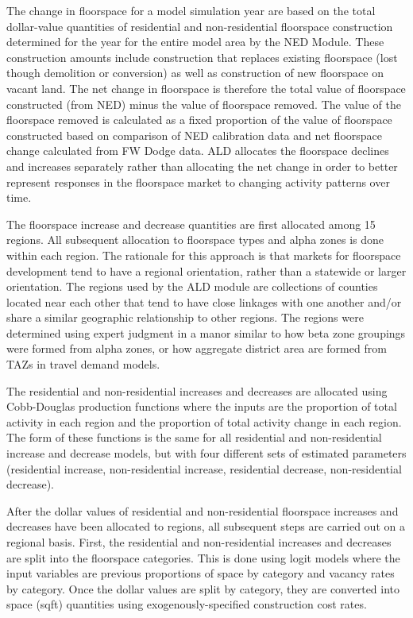 The change in floorspace for a model simulation year are based on the total dollar-value quantities of residential and non-residential floorspace construction determined for the year for the entire model area by the NED Module. These construction amounts include construction that replaces existing floorspace (lost though demolition or conversion) as well as construction of new floorspace on vacant land. The net change in floorspace is therefore the total value of floorspace constructed (from NED) minus the value of floorspace removed. The value of the floorspace removed is calculated as a fixed proportion of the value of floorspace constructed based on comparison of NED calibration data and net floorspace change calculated from FW Dodge data. ALD allocates the floorspace declines and increases separately rather than allocating the net change in order to better represent responses in the floorspace market to changing activity patterns over time.

The floorspace increase and decrease quantities are first allocated among 15 regions. All subsequent allocation to floorspace types and alpha zones is done within each region. The rationale for this approach is that markets for floorspace development tend to have a regional orientation, rather than a statewide or larger orientation. The regions used by the ALD module are collections of counties located near each other that tend to have close linkages with one another and/or share a similar geographic relationship to other regions. The regions were determined using  expert judgment in a manor similar to how beta zone groupings were formed from alpha zones, or how aggregate district area are formed from TAZs in travel demand models. 

The residential and non-residential increases and decreases are allocated using Cobb-Douglas production functions where the inputs are the proportion of total activity in each region and the proportion of total activity change in each region. The form of these functions is the same for all residential and non-residential increase and decrease models, but with four different sets of estimated parameters (residential increase, non-residential increase, residential decrease, non-residential decrease). 

After the dollar values of residential and non-residential floorspace increases and decreases have been allocated to regions, all subsequent steps are carried out on a regional basis. First, the residential and non-residential increases and decreases are split into the floorspace categories. This is done using logit models where the input variables are previous proportions of space by category and vacancy rates by category. Once the dollar values are split by category, they are converted into space (sqft) quantities using exogenously-specified construction cost rates. 

